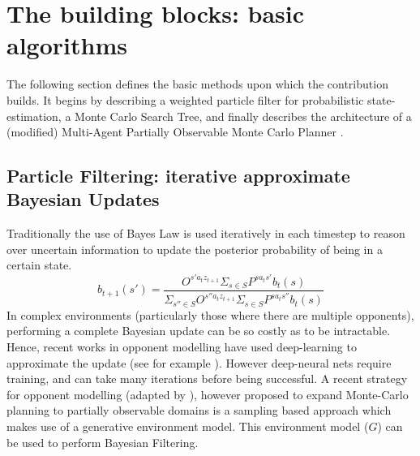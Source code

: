 \section{The building blocks: basic algorithms}
The following section defines the basic methods upon which the contribution builds. It begins by describing a weighted particle filter for probabilistic state-estimation, a Monte Carlo Search Tree, and finally describes the architecture of a (modified) Multi-Agent Partially Observable Monte Carlo Planner \cite{Hayashi_et_al2020,Silver2010}.  
\subsection{Particle Filtering: iterative approximate Bayesian Updates}\label{ParticleFiter}
Traditionally the use of Bayes Law is used iteratively in each timestep to reason over uncertain information to update the posterior probability of being in a certain state.
\begin{equation}
    b_{t+1}(s') = \frac{O^{s' a_t z_{t+1}} \Sigma_{s \in S} P^{s a_t s'} b_t (s)}{\Sigma_{s'' \in S} O^{s'' a_t z_{t+1}}  \Sigma_{s \in S} P^{s a_t s''} b_t (s)}
\end{equation} 
\newline \newline
In complex environments (particularly those where there are multiple opponents), performing a complete Bayesian update can be so costly as to be intractable. Hence, recent works in opponent modelling have used deep-learning to approximate the update (see for example \cite{he_om_DRL}). However deep-neural nets require training, and can take many iterations before being successful. A recent strategy for opponent modelling (adapted by \cite{Hayashi_et_al2020}), however proposed to expand Monte-Carlo planning to partially observable domains is a sampling based approach which makes use of a generative environment model. This environment model ($G$) can be used to perform Bayesian Filtering. 

